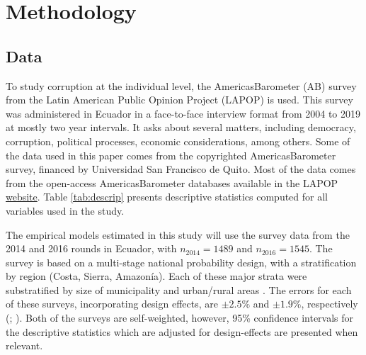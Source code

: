 \documentclass[12pt,a4]{article}\usepackage[]{graphicx}\usepackage[]{xcolor}
\begin{document}




\section{Methodology}
\label{sec:methodology} %
\subsection{Data}

To study corruption at the individual level, the AmericasBarometer (AB) survey from the Latin American Public Opinion Project (LAPOP) is used. This survey was administered in Ecuador in a face-to-face interview format from 2004 to 2019 at mostly two year intervals. It asks about several matters, including democracy, corruption, political processes, economic considerations, among others. Some of the data used in this paper comes from the copyrighted \textregistered AmericasBarometer survey, financed by Universidad San Francisco de Quito. Most of the data comes from the open-access AmericasBarometer databases available in the LAPOP \href{https://www.vanderbilt.edu/lapop/data-access.php}{website}. Table \ref{tab:descrip} presents descriptive statistics computed for all variables used in the study.

The empirical models estimated in this study will use the survey data from the 2014 and 2016 rounds in Ecuador, with $n_{2014}=1489$ and $n_{2016}= 1545$. The survey is based on a multi-stage national probability design, with a stratification by region (Costa, Sierra, Amazonía). Each of these major strata were substratified by size of municipality and urban/rural areas \parencite{LAPOP.2017}. The errors for each of these surveys, incorporating design effects, are $\pm 2.5\%$ and $\pm 1.9\%$, respectively (\cite{LAPOP.2014}; \cite{LAPOP.2017}). Both of the surveys are self-weighted, however, 95\% confidence intervals for the descriptive statistics which are adjusted for design-effects are presented when relevant. 
\end{document}
